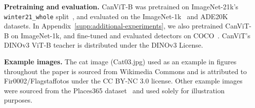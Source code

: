 \documentclass{article}
\begin{document}
\textbf{Pretraining and evaluation.}
CanViT-B was pretrained on ImageNet-21k's \texttt{winter21\_whole} split~\cite{ridnikImageNet21KPretrainingMasses2021}, and evaluated on the ImageNet-1k~\cite{russakovskyImageNetLargeScale2015} and ADE20K~\cite{zhouSceneParsingADE20K2017} datasets.
In Appendix~\ref{supp:additional-experiments}, we also pretrained CanViT-B on ImageNet-1k, and fine-tuned and evaluated detectors on COCO~\cite{linMicrosoftCOCOCommon2014}. CanViT's DINOv3 ViT-B teacher is distributed under the DINOv3 License.

\textbf{Example images.}
The cat image (Cat03.jpg) used as an example in figures throughout the paper is sourced from Wikimedia Commons and is attributed to Fir0002/Flagstaffotos under the CC BY-NC 3.0 license. Other example images were sourced from the Places365 dataset~\cite{zhouPlaces10Million2017} and used solely for illustration purposes.


\makeatletter
\if@preprint\else
  
\fi
\makeatother
\end{document}
